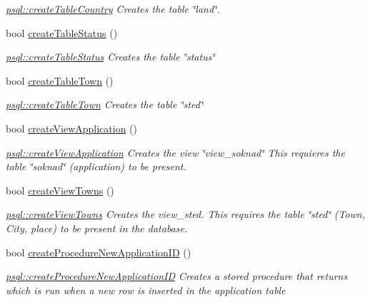 \begin{DoxyCompactItemize}
\begin{DoxyCompactList}\small\item\em \mbox{\hyperlink{classpsql_ab6e496d8471f3cd9c5c082a6ba75c25b}{psql\+::create\+Table\+Country}} Creates the table \char`\"{}land\char`\"{}. \end{DoxyCompactList}\item 
bool \mbox{\hyperlink{classpsql_a427ad0f483c8ab7a4d23912278bc69e8}{create\+Table\+Status}} ()
\begin{DoxyCompactList}\small\item\em \mbox{\hyperlink{classpsql_a427ad0f483c8ab7a4d23912278bc69e8}{psql\+::create\+Table\+Status}} Creates the table \char`\"{}status\char`\"{} \end{DoxyCompactList}\item 
bool \mbox{\hyperlink{classpsql_a95d1f522766174bd2c6a7b94f725719c}{create\+Table\+Town}} ()
\begin{DoxyCompactList}\small\item\em \mbox{\hyperlink{classpsql_a95d1f522766174bd2c6a7b94f725719c}{psql\+::create\+Table\+Town}} Creates the table \char`\"{}sted\char`\"{} \end{DoxyCompactList}\item 
bool \mbox{\hyperlink{classpsql_ad6fb8e1e7177c7996f297d477ecceb27}{create\+View\+Application}} ()
\begin{DoxyCompactList}\small\item\em \mbox{\hyperlink{classpsql_ad6fb8e1e7177c7996f297d477ecceb27}{psql\+::create\+View\+Application}} Creates the view \char`\"{}view\+\_\+soknad\char`\"{} This requieres the table \char`\"{}soknad\char`\"{} (application) to be present. \end{DoxyCompactList}\item 
bool \mbox{\hyperlink{classpsql_ac5b1230ac405a600b67b144060b33a0d}{create\+View\+Towns}} ()
\begin{DoxyCompactList}\small\item\em \mbox{\hyperlink{classpsql_ac5b1230ac405a600b67b144060b33a0d}{psql\+::create\+View\+Towns}} Creates the view\+\_\+sted. This requires the table \char`\"{}sted\char`\"{} (Town, City, place) to be present in the database. \end{DoxyCompactList}\item 
bool \mbox{\hyperlink{classpsql_ae9e3ee06f4a5ecd4178662dfa0655fe1}{create\+Procedure\+New\+Application\+ID}} ()
\begin{DoxyCompactList}\small\item\em \mbox{\hyperlink{classpsql_ae9e3ee06f4a5ecd4178662dfa0655fe1}{psql\+::create\+Procedure\+New\+Application\+ID}} Creates a stored procedure that returns which is run when a new row is inserted in the application table \end{DoxyCompactList}\item 

\end{DoxyCompactItemize}
